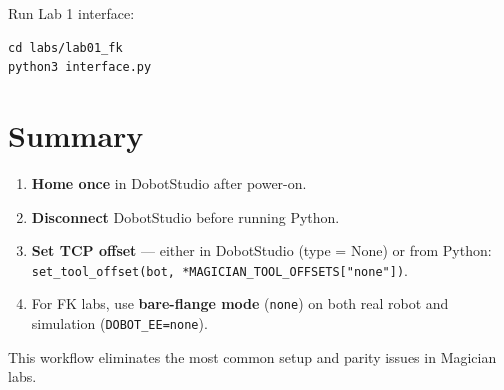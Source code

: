 \documentclass[11pt,a4paper]{article}
\begin{document}
Run Lab 1 interface:
\begin{verbatim}
cd labs/lab01_fk
python3 interface.py
\end{verbatim}

\section{Summary}

\begin{enumerate}[leftmargin=1.5em]
  \item \textbf{Home once} in DobotStudio after power-on.
  \item \textbf{Disconnect} DobotStudio before running Python.
  \item \textbf{Set TCP offset} — either in DobotStudio (type = None) or from
        Python: \texttt{set\_tool\_offset(bot, *MAGICIAN\_TOOL\_OFFSETS["none"])}.
  \item For FK labs, use \textbf{bare-flange mode} (\texttt{none}) on both real
        robot and simulation (\texttt{DOBOT\_EE=none}).
\end{enumerate}

This workflow eliminates the most common setup and parity issues in Magician labs.
\end{document}
